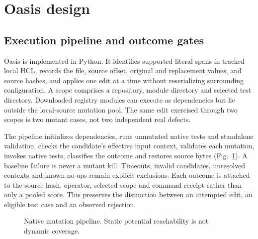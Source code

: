 \section{Oasis design}\label{sec:design}
\subsection{Execution pipeline and outcome gates}
Oasis is implemented in Python. It identifies supported literal spans in tracked local HCL, records the file, source offset, original and replacement values, and source hashes, and applies one edit at a time without reserializing surrounding configuration. A scope comprises a repository, module directory and selected test directory. Downloaded registry modules can execute as dependencies but lie outside the local-source mutation pool. The same edit exercised through two scopes is two mutant cases, not two independent real defects.

The pipeline initializes dependencies, runs unmutated native tests and standalone validation, checks the candidate's effective input context, validates each mutation, invokes native tests, classifies the outcome and restores source bytes (Fig.~\ref{fig:pipeline}). A baseline failure is never a mutant kill. Timeouts, invalid candidates, unresolved contexts and known no-ops remain explicit exclusions. Each outcome is attached to the source hash, operator, selected scope and command receipt rather than only a pooled score. This preserves the distinction between an attempted edit, an eligible test case and an observed rejection.

\begin{figure}[ht]
\centering
{}
\caption{Native mutation pipeline. Static potential reachability is not dynamic coverage.}\label{fig:pipeline}
\end{figure}

